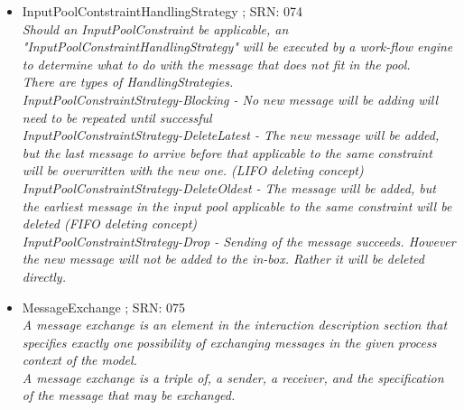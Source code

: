\begin{itemize}
\begin{itemize}
\begin{itemize}
\begin{itemize}
{			E.g. "Only one order from the same customer" (during happy hour at the bar)}
			\item MessageTypeConstraint ; SRN: 072 \\ \textit{An InputPool constraint that limits the number of message of a certain type in the input pool.\\
			E.g. You can accept only "three request at once}
			\item SenderTypeConstraint ; SRN: 073 \\ \textit{An InputPool constraint that limits the number of message from a certain Sender subject in the input pool.\\
			E.g. as long as a customer has non non-fulfilled request of any type he may not place messages}
		\end{itemize}
		\item InputPoolContstraintHandlingStrategy ; SRN: 074 \\ \textit{Should an InputPoolConstraint be applicable, an "InputPoolConstraintHandlingStrategy" will be executed by a work-flow engine to determine what to do with the message that does not fit in the pool.\\
		There are types of HandlingStrategies. \\
		InputPoolConstraintStrategy-Blocking - No new message will be adding will need to be repeated until successful \\
		InputPoolConstraintStrategy-DeleteLatest - The new message will be added, but the last message to arrive before that applicable to the same constraint will be overwritten with the new one. (LIFO deleting concept)\\
		InputPoolConstraintStrategy-DeleteOldest - The message will be added, but the earliest message in the input pool applicable to the same constraint will be deleted (FIFO deleting concept)\\
		InputPoolConstraintStrategy-Drop - Sending of the message succeeds. However the new message will not be added to the in-box. Rather it will be deleted directly.}
		\item MessageExchange ; SRN: 075 \\ \textit{A message exchange is an element in the interaction description section that specifies exactly one possibility of exchanging messages in the given process context of the model.\\
		A message exchange is a triple of, a sender, a receiver, and the specification of the message that may be exchanged.\\
}
\end{itemize}
\end{itemize}
\end{itemize}
